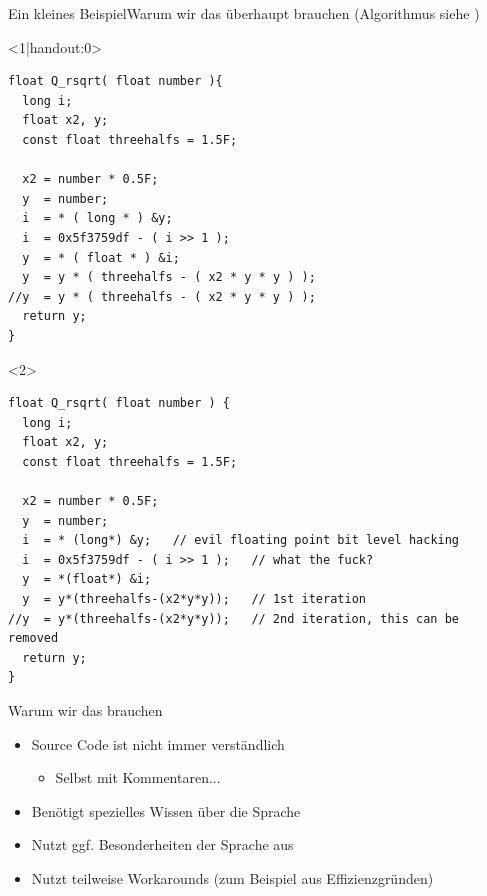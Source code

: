 \begin{frame}[fragile]{Ein kleines Beispiel}{Warum wir das überhaupt brauchen (Algorithmus siehe \cite{wiki:qrsqrt})}
\lstset{style=cpp}
\begin{onlyenv}<1|handout:0>
\begin{lstlisting}
float Q_rsqrt( float number ){
  long i;
  float x2, y;
  const float threehalfs = 1.5F;

  x2 = number * 0.5F;
  y  = number;
  i  = * ( long * ) &y;                       
  i  = 0x5f3759df - ( i >> 1 );                
  y  = * ( float * ) &i;
  y  = y * ( threehalfs - ( x2 * y * y ) );   
//y  = y * ( threehalfs - ( x2 * y * y ) );   
  return y;
}
\end{lstlisting}
\end{onlyenv}
\begin{onlyenv}<2>
\begin{lstlisting}
float Q_rsqrt( float number ) {
  long i;
  float x2, y;
  const float threehalfs = 1.5F;

  x2 = number * 0.5F;
  y  = number;
  i  = * (long*) &y;   // evil floating point bit level hacking
  i  = 0x5f3759df - ( i >> 1 );   // what the fuck?
  y  = *(float*) &i;
  y  = y*(threehalfs-(x2*y*y));   // 1st iteration
//y  = y*(threehalfs-(x2*y*y));   // 2nd iteration, this can be removed
  return y;
}
\end{lstlisting}
\end{onlyenv}
\end{frame}

\begin{frame}{Warum wir das brauchen}
    \begin{itemize}[<+->]
        \item Source Code ist nicht immer verständlich
        \begin{itemize}
            \item Selbst mit Kommentaren...
        \end{itemize}
        \item Benötigt spezielles Wissen über die Sprache
        \item Nutzt ggf. Besonderheiten der Sprache aus
        \item Nutzt teilweise Workarounds (zum Beispiel aus Effizienzgründen)
    \end{itemize}
\end{frame}


